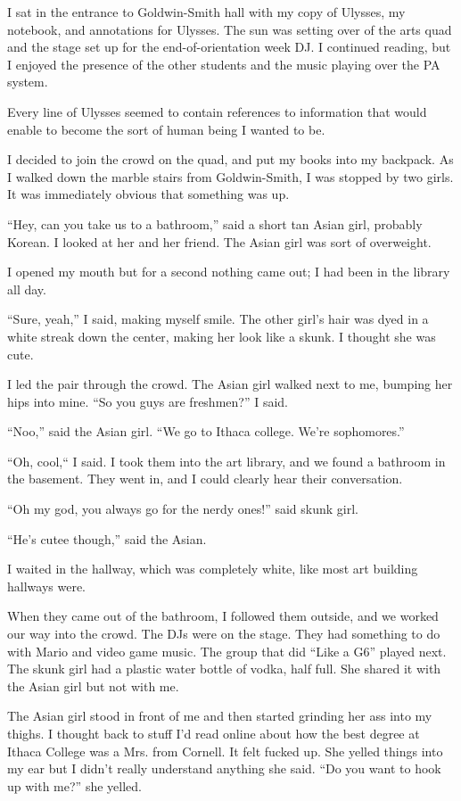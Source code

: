 I sat in the entrance to Goldwin-Smith hall with my copy of Ulysses, my
notebook, and annotations for Ulysses.  The sun was setting over of the arts
quad and the stage set up for the end-of-orientation week DJ. I continued
reading,  but I enjoyed the presence of the other students and the music
playing over the PA system.

Every line of Ulysses seemed to contain references to information that would
enable to become the sort of human being I wanted to be.  

I decided to join the crowd on the quad, and put my books into my backpack.  As
I walked down the marble stairs from Goldwin-Smith, I was stopped by two girls.
It was immediately obvious that something was up.

``Hey, can you take us to a bathroom,'' said a short tan Asian girl, probably
Korean.  I looked at her and her friend.  The Asian girl was sort of overweight.

I opened my mouth but for a second nothing came out; I had been in the library
all day.

``Sure, yeah,'' I said, making myself smile.  The other girl's hair was dyed in
a white streak down the center, making her look like a skunk.  I thought she
was cute.

I led the pair through the crowd.  The Asian girl walked next to me, bumping
her hips into mine. ``So you guys are freshmen?'' I said.  

``Noo,'' said the Asian girl.  ``We go to Ithaca college.  We're sophomores.''

``Oh, cool,`` I said.   I took them into the art library, and we found a
bathroom in the basement.  They went in, and I could clearly hear their
conversation.

``Oh my god, you always go for the nerdy ones!'' said skunk girl.

``He's cutee though,'' said the Asian. 

I waited in the hallway, which was completely white, like most art building
hallways were.

When they came out of the bathroom, I followed them outside, and we worked our
way into the crowd.  The DJs were on the stage.  They had something to do with
Mario and video game music.  The group that did ``Like a G6'' played next.  The
skunk girl had a plastic water bottle of vodka, half full.  She shared it with
the Asian girl but not with me.

The Asian girl stood in front of me and then started grinding her ass into my
thighs.  I thought back to stuff I'd read online about how the best degree at
Ithaca College was a Mrs. from Cornell.  It felt fucked up.  She yelled things
into my ear but I didn't really understand anything she said.  ``Do you want to
hook up with me?'' she yelled.  

